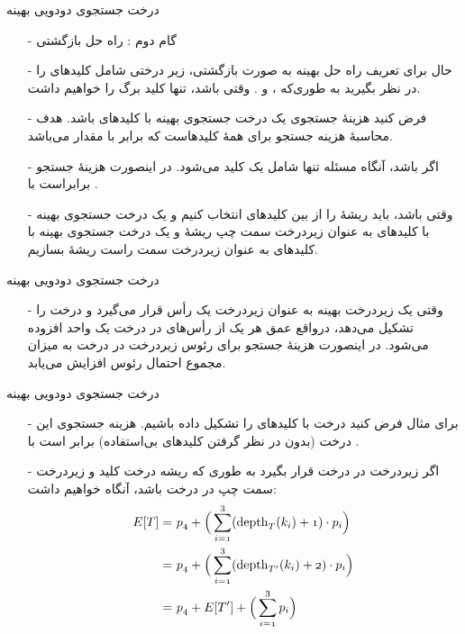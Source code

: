 \begin{frame}{‌درخت جستجوی دودویی بهینه}
\begin{itemize}\itemr
\item[-]
گام دوم : راه حل بازگشتی
\item[-]
حال برای تعریف راه ‌حل بهینه به صورت بازگشتی، زیر درختی شامل کلیدهای
را در نظر بگیرید به طوری‌که
،
و
. وقتی
باشد، تنها کلید برگ
را خواهیم داشت.
\item[-]
فرض کنید
هزینهٔ جستجوی یک درخت جستجوی بهینه با کلیدهای
باشد. هدف محاسبهٔ هزینه جستجو برای همهٔ کلیدهاست که برابر با مقدار
می‌باشد.
\item[-]
اگر
باشد، آنگاه مسئله تنها شامل یک کلید
می‌شود. در اینصورت هزینهٔ جستجو برابراست با
.
\item[-]
وقتی
باشد، باید ریشهٔ
را از بین کلیدهای
انتخاب کنیم و یک درخت جستجوی بهینه با کلیدهای
به عنوان زیردرخت سمت چپ ریشهٔ
و یک درخت جستجوی بهینه با کلیدهای
به عنوان زیردرخت سمت راست ریشهٔ
بسازیم.
\end{itemize}
\end{frame}


\begin{frame}{‌درخت جستجوی دودویی بهینه}
\begin{itemize}\itemr
\item[-]
وقتی یک زیردرخت بهینه 
 به عنوان زیردرخت یک رأس قرار می‌گیرد و درخت
را تشکیل می‌دهد،
 درواقع عمق هر یک از رأس‌های 
در درخت
  یک واحد افزوده می‌شود. در اینصورت هزینهٔ جستجو برای رئوس زیردرخت
در درخت
   به میزان مجموع احتمال رئوس 
    افزایش می‌یابد.
\end{itemize}
\end{frame}

\begin{frame}{‌درخت جستجوی دودویی بهینه}
\begin{itemize}\itemr
\item[-]
برای مثال فرض کنید درخت
 با کلید‌های
را تشکیل داده باشیم. هزینه جستجوی این درخت (بدون در نظر گرفتن کلیدهای بی‌استفاده) برابر است با
 .
\item[-]
اگر زیردرخت 
در درخت 
قرار بگیرد به طوری که ریشه درخت 
کلید
و
زیردرخت سمت چپ در درخت 
باشد، آنگاه خواهیم داشت:
\begin{align*}
\mathnormal{E[T]} =& \mathnormal{~p_4 + \Big(\sum_{i=1}^3 (\text{depth}_{T}(k_i)+1 ) \cdot p_{i} \Big)} \\
=& \mathnormal{~p_4 + \Big( \sum_{i=1}^3 (\text{depth}_{T'}(k_i)+2) \cdot p_{i} \Big) } \\
=& \mathnormal{~p_4 + E[T'] + \Big( \sum_{i=1}^3 p_{i} \Big) }
\end{align*}
\end{itemize}
\end{frame}

